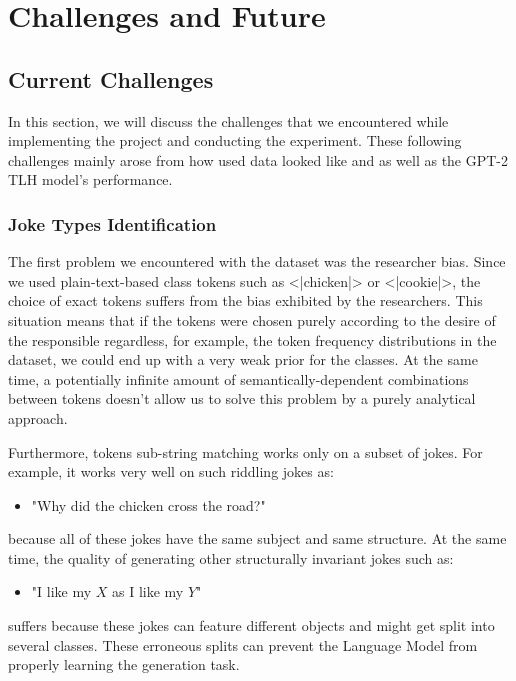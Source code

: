 
\chapter{Challenges and Future}\label{chapter:challenges}

\section{Current Challenges}

In this section, we will discuss the challenges that we encountered while implementing the project and conducting the experiment. These following challenges mainly arose from how used data looked like and as well as the GPT-2 TLH model's performance.

\subsection{Joke Types Identification}

The first problem we encountered with the dataset was the researcher bias. Since we used plain-text-based class tokens such as <|chicken|> or <|cookie|>, the choice of exact tokens suffers from the bias exhibited by the researchers. This situation means that if the tokens were chosen purely according to the desire of the responsible regardless, for example, the token frequency distributions in the dataset, we could end up with a very weak prior for the classes. At the same time, a potentially infinite amount of semantically-dependent combinations between tokens doesn't allow us to solve this problem by a purely analytical approach.

Furthermore, tokens sub-string matching works only on a subset of jokes. For example, it works very well on such riddling jokes as:
\begin{itemize}
    \item "Why did the chicken cross the road?"
\end{itemize}
because all of these jokes have the same subject and same structure.
At the same time, the quality of generating other structurally invariant jokes such as:
\begin{itemize}
    \item "I like my \( X\) as I like my \( Y\)" 
\end{itemize}
suffers because these jokes can feature different objects and might get split into several classes. These erroneous splits can prevent the Language Model from properly learning the generation task.

